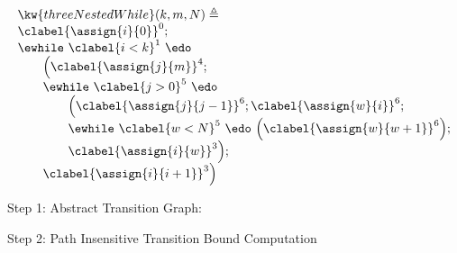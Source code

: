 \begin{example}
    \label{ex:threeNestedWhile}
    \[
    \begin{array}{l}
        \kw{threeNestedWhile}(k, m, N) \triangleq \\
        \clabel{ \assign{i}{0} }^{0} ; \\
            \ewhile ~ \clabel{i < k}^{1} ~ \edo ~ \\
            \qquad \Big(
             \clabel{\assign{j}{m}}^{4} ;\\
             \qquad \ewhile ~ \clabel{j > 0}^{5} ~ \edo ~ \\
             \qquad \qquad \Big(
              \clabel{\assign{j}{j-1}}^{6};
              \clabel{\assign{w}{i}}^{6};\\
              \qquad \qquad \ewhile ~ \clabel{w < N}^{5} ~ \edo ~
              \Big(
                \clabel{\assign{w}{w + 1}}^{6}
                  \Big); \\
                  \qquad \qquad \clabel{\assign{i}{w}}^{3}
                  \Big); \\
                  \qquad \clabel{\assign{i}{i+1}}^{3}
              \Big)
        \end{array}
    \]
\end{example}

Step 1: Abstract Transition Graph:

Step 2: Path Insensitive Transition Bound Computation

